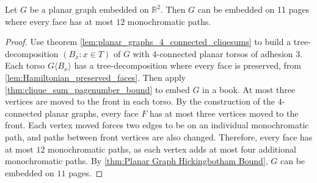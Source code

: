 \begin{theorem}\label{thm:embedded_graph}
	Let \( G \) be a planar graph embedded on $\mathbb{R}^2$. Then $G$ can be embedded on 11 pages where every face has at most $12$ monochromatic paths. 
\end{theorem}

\begin{proof}
	Use theorem \cref{lem:planar_graphs_4_connected_cliqesums} to build a tree-decomposition $(B_x : x \in T)$ of $G$ with $4$-connected planar torsos of adhesion 3. Each torso $G \langle B_x \rangle$ has a tree-decomposition where every face is preserved, from \cref{lem:Hamiltonian_preserved_faces}. Then apply \cref{thm:clique_sum_pagenumber_bound} to embed $G$ in a book. At most three vertices are moved to the front in each torso. By the construction of the $4$-connected planar graphs, every face $F$ has at most three vertices moved to the front. Each vertex moved forces two edges to be on an individual monochromatic path, and paths between front vertices are also changed. Therefore, every face has at most $12$ monochromatic paths, as each vertex adds at most four additional monochromatic paths. By \cref{thm:Planar Graph Hickingbotham Bound}, $G$ can be embedded on $11$ pages.
\end{proof}	